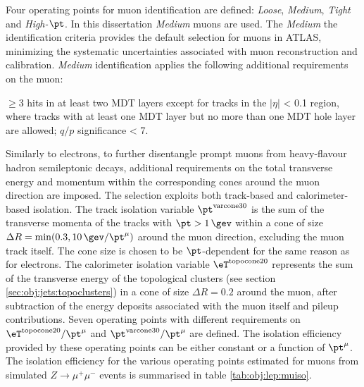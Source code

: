 Four operating points for muon identification are defined: {\sl Loose}, {\sl Medium}, {\sl Tight} and {\sl High-$\pt$}. In this dissertation {\sl Medium} muons are used. The {\sl Medium} the identification criteria provides the default selection for muons in ATLAS, minimizing the systematic uncertainties associated with muon reconstruction and calibration. {\sl Medium} identification applies the following additional requirements on the muon:

\bi
\ib $\ge 3$ hits in at least two MDT layers except for tracks in the $|\eta|$ < 0.1 region, where tracks with at least one MDT layer but no more than one MDT hole layer are allowed;
\ib $q/p$ significance < 7.
\ei

Similarly to electrons, to further disentangle prompt muons from heavy-flavour hadron semileptonic decays, additional requirements on the total transverse energy and momentum within the corresponding cones around the muon direction are imposed. The selection exploits both track-based and calorimeter-based isolation. The track isolation variable $\pt^{\rm varcone30}$ is the sum of the transverse momenta of the tracks with $\pt > 1 \,\gev$ within a cone of size $\Delta R = \min(0.3,10\,\gev/\pt^{\mu})$ around the muon direction, excluding the muon track itself. The cone size is chosen to be $\pt$-dependent for the same reason as for electrons. The calorimeter isolation variable $\eT^{\rm topocone20}$ represents the sum of the transverse energy of the topological clusters (see section \ref{sec:obj:jets:topoclusters}) in a cone of size $\Delta R=0.2$ around the muon, after subtraction of the energy deposits associated with the muon itself and pileup contributions. 
Seven operating points with different requirements on $\eT^{\rm topocone20}/\pt^{\mu}$ and $\pt^{\rm varcone30}/\pt^{\mu}$ are defined. The isolation efficiency provided by these operating points can be either constant or a function of $\pt^{\mu}$. The isolation efficiency for the various operating points estimated for muons from simulated $Z\to \mu^{+}\mu^{-}$ events is summarised in table \ref{tab:obj:lep:muiso}. 


